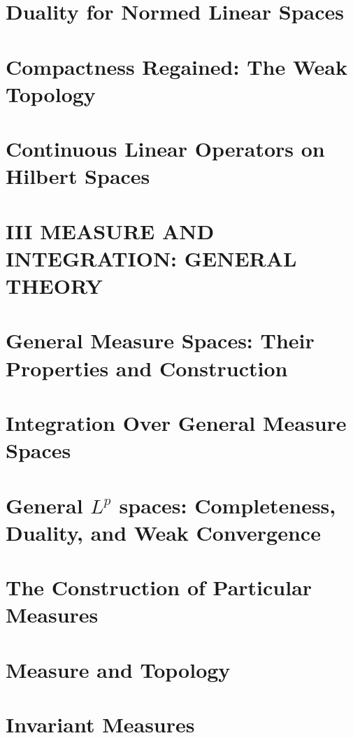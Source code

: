 \documentclass[a4paper,10pt]{book}
\theoremstyle{plain} %
\begin{document}
\chapter{Duality for Normed Linear Spaces}
\chapter{Compactness Regained: The Weak Topology}
\chapter{Continuous Linear Operators on Hilbert Spaces}

\setcounter{chapter}{0}
\chapter*{III MEASURE AND INTEGRATION: GENERAL THEORY} 
\setcounter{chapter}{16}

\chapter{General Measure Spaces: Their Properties and Construction}
\chapter{Integration Over General Measure Spaces}
\chapter{General $L^p$ spaces: Completeness, Duality, and Weak Convergence}
\chapter{The Construction of Particular Measures}
\chapter{Measure and Topology}
\chapter{Invariant Measures}
\end{document}
